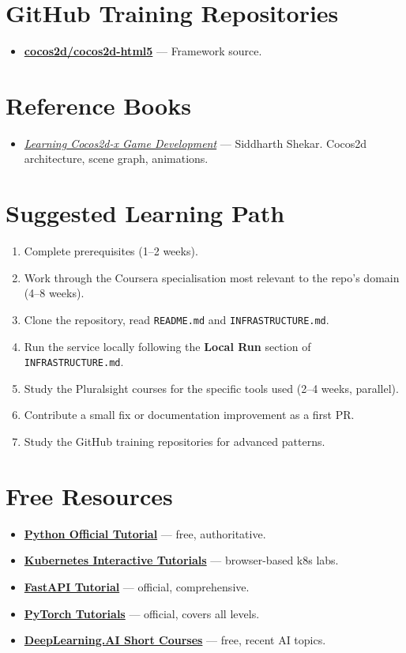 \documentclass[11pt,a4paper]{article}
\begin{document}
\section{GitHub Training Repositories}
\begin{itemize}[leftmargin=1.5em]
  \item \href{https://github.com/cocos2d/cocos2d-html5}{\textbf{cocos2d/cocos2d-html5}} — Framework source.
\end{itemize}

\section{Reference Books}
\begin{itemize}[leftmargin=1.5em]
  \item \href{https://www.packtpub.com/product/learning-cocos2d-x-game-development/9781784399849}{\textit{Learning Cocos2d-x Game Development}} — Siddharth Shekar. Cocos2d architecture, scene graph, animations.
\end{itemize}

\section{Suggested Learning Path}
\begin{enumerate}
  \item Complete prerequisites (1--2 weeks).
  \item Work through the Coursera specialisation most relevant to the repo's domain (4--8 weeks).
  \item Clone the repository, read \texttt{README.md} and \texttt{INFRASTRUCTURE.md}.
  \item Run the service locally following the \textbf{Local Run} section of \texttt{INFRASTRUCTURE.md}.
  \item Study the Pluralsight courses for the specific tools used (2--4 weeks, parallel).
  \item Contribute a small fix or documentation improvement as a first PR.
  \item Study the GitHub training repositories for advanced patterns.
\end{enumerate}

\section{Free Resources}
\begin{itemize}
  \item \href{https://docs.python.org/3/tutorial/}{\textbf{Python Official Tutorial}} — free, authoritative.
  \item \href{https://kubernetes.io/docs/tutorials/}{\textbf{Kubernetes Interactive Tutorials}} — browser-based k8s labs.
  \item \href{https://fastapi.tiangolo.com/tutorial/}{\textbf{FastAPI Tutorial}} — official, comprehensive.
  \item \href{https://pytorch.org/tutorials/}{\textbf{PyTorch Tutorials}} — official, covers all levels.
  \item \href{https://www.deeplearning.ai/short-courses/}{\textbf{DeepLearning.AI Short Courses}} — free, recent AI topics.
\end{itemize}
\end{document}
